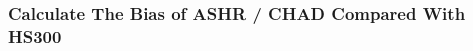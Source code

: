 \documentclass{article}
\begin{document}
    \begin{center}
    \end{center}
    { \hspace*{\fill} \\}
    
    \begin{center}
    \end{center}
    { \hspace*{\fill} \\}
    
    \begin{center}
    \end{center}
    { \hspace*{\fill} \\}
    
    \subsubsection{Calculate The Bias of ASHR / CHAD Compared With
HS300}\label{calculate-the-bias-of-ashr-chad-compared-with-hs300}
\end{document}
